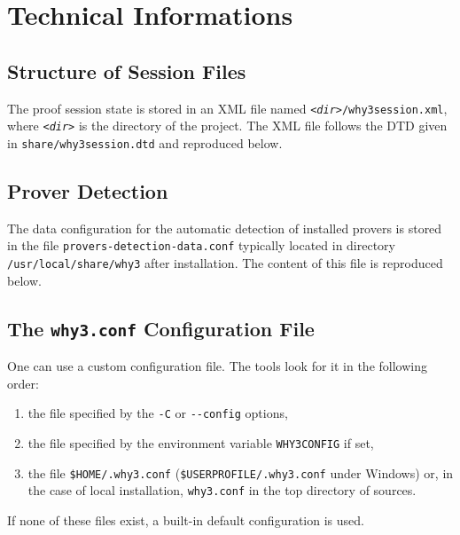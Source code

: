 \chapter{Technical Informations}

\section{Structure of Session Files}

The proof session state is stored in an XML file named
\texttt{\textsl{<dir>}/why3session.xml}, where \texttt{\textsl{<dir>}}
is the directory of the project.
The XML file follows the DTD given in \texttt{share/why3session.dtd} and reproduced below.



\section{Prover Detection}
\label{sec:proverdetecttiondata}

The data configuration for the automatic detection of
installed provers is stored in the file
\texttt{provers-detection-data.conf} typically located in directory
\verb|/usr/local/share/why3| after installation. The content of this
file is reproduced below.
{\footnotesize

}

\section{The \texttt{why3.conf} Configuration File}
\label{sec:whyconffile}

One can use a custom configuration file. The \why
tools look for it in the following order:
\begin{enumerate}
\item the file specified by the \texttt{-C} or \texttt{-{}-config} options,
\item the file specified by the environment variable
  \texttt{WHY3CONFIG} if set,
\item the file \texttt{\$HOME/.why3.conf}
  (\texttt{\$USERPROFILE/.why3.conf} under Windows) or, in the case of
  local installation, \texttt{why3.conf} in the top directory of \why sources.
\end{enumerate}
If none of these files exist, a built-in default configuration is used.

